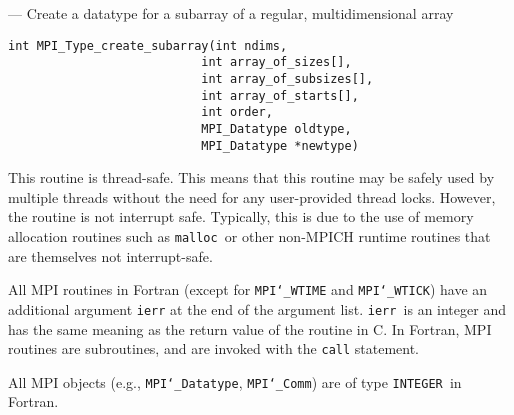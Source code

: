 \startmanpage
{}
--- Create a datatype for a subarray of a regular,  multidimensional array 
\startvb\begin{verbatim}
int MPI_Type_create_subarray(int ndims,
                           int array_of_sizes[],
                           int array_of_subsizes[],
                           int array_of_starts[],
                           int order,
                           MPI_Datatype oldtype,
                           MPI_Datatype *newtype)

\end{verbatim}
\endvb

\par
{}
\par
{}
\par
This routine is thread-safe.  This means that this routine may be
safely used by multiple threads without the need for any user-provided
thread locks.  However, the routine is not interrupt safe.  Typically,
this is due to the use of memory allocation routines such as {\tt malloc
}or other non-MPICH runtime routines that are themselves not interrupt-safe.
\par
{}
All MPI routines in Fortran (except for {\tt MPI{\tt \char`\_}WTIME} and {\tt MPI{\tt \char`\_}WTICK}) have
an additional argument {\tt ierr} at the end of the argument list.  {\tt ierr
}is an integer and has the same meaning as the return value of the routine
in C.  In Fortran, MPI routines are subroutines, and are invoked with the
{\tt call} statement.
\par
All MPI objects (e.g., {\tt MPI{\tt \char`\_}Datatype}, {\tt MPI{\tt \char`\_}Comm}) are of type {\tt INTEGER
}in Fortran.
